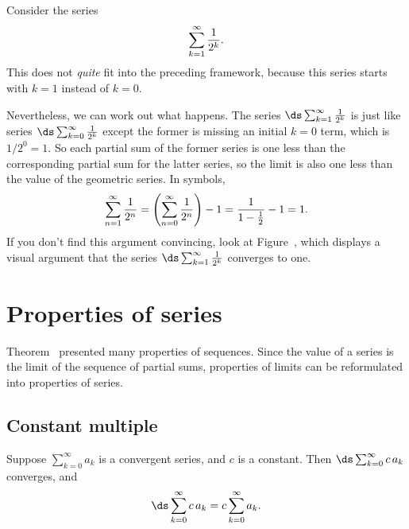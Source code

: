 \begin{example}
Consider the series 
$$\sum_{k=1}^\infty {1\over 2^k}.$$
This does not \textit{quite} fit into the preceding framework, because
this series starts with $k = 1$ instead of $k = 0$.  

Nevertheless, we can work out what happens.  The series
$\ds\sum_{k=1}^\infty {1\over 2^k}$ is just like series
$\ds\sum_{k=0}^\infty \frac{1}{2^k}$ except the former is missing an
initial $k = 0$ term, which is $1/2^0 = 1$.  So each partial sum of
the former series is one less than the corresponding partial sum for
the latter series, so the limit is also one less than the value of the
geometric series.  In symbols,
$$
\sum_{n=1}^\infty {1\over 2^n} = \left( \sum_{n=0}^\infty {1\over 2^n} \right) - 1 = \frac{1}{1 - \frac{1}{2}} - 1 = 1.
$$
If you don't find this argument convincing, look at
Figure~, which displays a
visual argument that the series $\ds\sum_{k=1}^\infty \frac{1}{2^k}$
converges to one.
\end{example}

\section{Properties of series}

Theorem~ presented many properties
of sequences.  Since the value of a series is the limit of the
sequence of partial sums, properties of limits can be reformulated
into properties of series.

\subsection{Constant multiple}

\begin{theorem} \relax\label{thm:series-are-linear}
Suppose $\sum_{k=0}^\infty a_k$ is a convergent series, and $c$ is a constant. Then $\ds\sum_{k=0}^\infty c\,a_k$ converges, and
$$\ds\sum_{k=0}^\infty c\,a_k=c\sum_{k=0}^\infty a_k.$$
\end{theorem}

